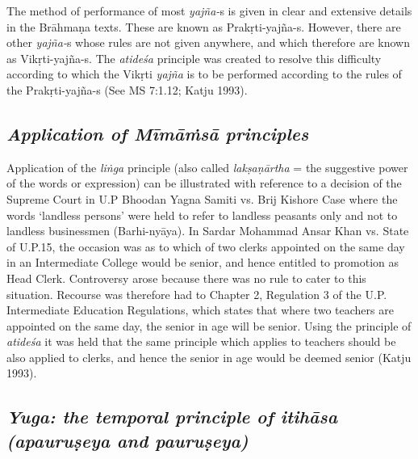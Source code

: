 The method of performance of most \textit{yajña-}s is given in clear and extensive details in the Brāhmaṇa texts. These are known as Prakṛti-yajña-s. However, there are other \textit{yajña-}s whose rules are not given anywhere, and which therefore are known as Vikṛti-yajña-s. The \textit{atideśa} principle was created to resolve this difficulty according to which the Vikṛti \textit{yajña} is to be performed according to the rules of the Prakṛti-yajña-s (See MS 7:1.12; Katju 1993).


\subsection*{\textit{Application of Mīmāṁsā principles}}

Application of the \textit{liṅga} principle (also called \textit{lakṣaṇārtha} = the suggestive power of the words or expression) can be illustrated with reference to a decision of the Supreme Court in U.P Bhoodan Yagna Samiti vs. Brij Kishore Case where the words ‘landless persons’ were held to refer to landless peasants only and not to landless businessmen (Barhi-nyāya). In Sardar Mohammad Ansar Khan vs. State of U.P.15, the occasion was as to which of two clerks appointed on the same day in an Intermediate College would be senior, and hence entitled to promotion as Head Clerk. Controversy arose because there was no rule to cater to this situation. Recourse was therefore had to Chapter 2, Regulation 3 of the U.P. Intermediate Education Regulations, which states that where two teachers are appointed on the same day, the senior in age will be senior. Using the principle of \textit{atideśa} it was held that the same principle which applies to teachers should be also applied to clerks, and hence the senior in age would be deemed senior (Katju 1993).


\subsection*{\textit{Yuga: the temporal principle of itihāsa (apauruṣeya and pauruṣeya)}}

